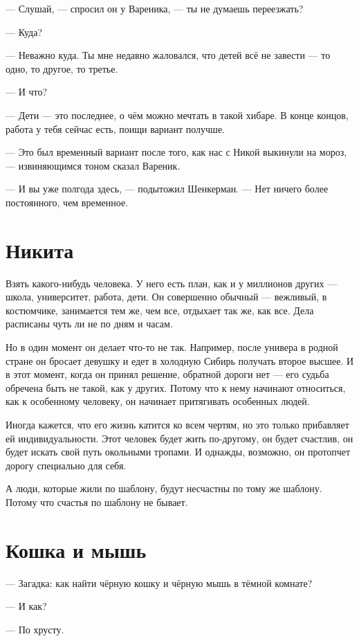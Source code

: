\documentclass[a4paper,10pt,fleqn]{book}\usepackage{polyglossia}\setdefaultlanguage{english}\setotherlanguage{russian}\defaultfontfeatures{Ligatures=TeX,Mapping=tex-text} \usepackage{xcolor}\definecolor{lightgray}{HTML}{bbbbbb}\color{lightgray}\newcommand{\ml}[3]{\textcolor{black}{#3}}
\begin{document}
--- Слушай, --- спросил он у Вареника, --- ты не думаешь переезжать?

--- Куда?

--- Неважно куда.
Ты мне недавно жаловался, что детей всё не завести --- то одно, то другое, то третье.

--- И что?

--- Дети --- это последнее, о чём можно мечтать в такой хибаре.
В конце концов, работа у тебя сейчас есть, поищи вариант получше.

--- Это был временный вариант после того, как нас с Никой выкинули на мороз, --- извиняющимся тоном сказал Вареник.

--- И вы уже полгода здесь, --- подытожил Шенкерман.
--- Нет ничего более постоянного, чем временное.

\section{Никита}

Взять какого-нибудь человека.
У него есть план, как и у миллионов других --- школа, университет, работа, дети.
Он совершенно обычный --- вежливый, в костюмчике, занимается тем же, чем все, отдыхает так же, как все.
Дела расписаны чуть ли не по дням и часам.

Но в один момент он делает что-то не так.
Например, после универа в родной стране он бросает девушку и едет в холодную Сибирь получать второе высшее.
И в этот момент, когда он принял решение, обратной дороги нет --- его судьба обречена быть не такой, как у других.
Потому что к нему начинают относиться, как к особенному человеку, он начинает притягивать особенных людей.

Иногда кажется, что его жизнь катится ко всем чертям, но это только прибавляет ей индивидуальности.
Этот человек будет жить по-другому, он будет счастлив, он будет искать свой путь окольными тропами.
И однажды, возможно, он протопчет дорогу специально для себя.

А люди, которые жили по шаблону, будут несчастны по тому же шаблону.
Потому что счастья по шаблону не бывает.

\section{Кошка и мышь}

--- Загадка: как найти чёрную кошку и чёрную мышь в тёмной комнате?

--- И как?

--- По хрусту.
\end{document}
